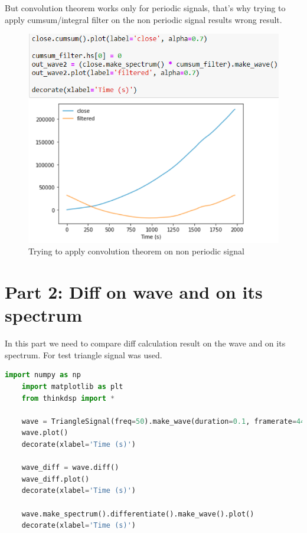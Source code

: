 \documentclass[a4paper]{article}
\begin{document}
        But convolution theorem works only for periodic signals, that's why trying to apply cumsum/integral filter on the non periodic signal results wrong result.
        
        \begin{figure}[H]
            \centering
            \includegraphics[width=\textwidth]{img/p1_3.png}
            \caption{Trying to apply convolution theorem on non periodic signal}
            \label{fig:p1_1}
        \end{figure}
        
    \newpage
        \section{Part 2: Diff on wave and on its spectrum}

        In this part we need to compare diff calculation result on the wave and on its spectrum.
        For test triangle signal was used.
        
        \begin{lstlisting}[language=Python,caption=Diff and deriv code,label={lst:part1_2}]
    import numpy as np
    import matplotlib as plt
    from thinkdsp import *
    
    wave = TriangleSignal(freq=50).make_wave(duration=0.1, framerate=44100)
    wave.plot()
    decorate(xlabel='Time (s)')
    
    wave_diff = wave.diff()
    wave_diff.plot()
    decorate(xlabel='Time (s)')
    
    wave.make_spectrum().differentiate().make_wave().plot()
    decorate(xlabel='Time (s)')
        \end{lstlisting}
        
\end{document}
